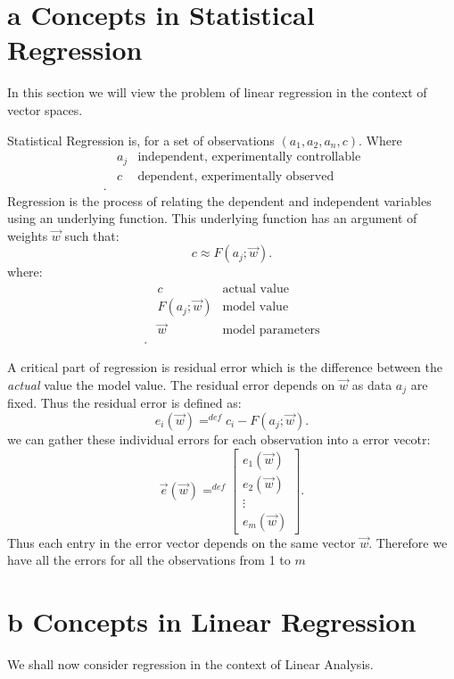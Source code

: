 \documentclass[12pt]{book}
\title{\coursetitle\linebreak\lecturename}
\author{\\Cain Susko\\ 
           \\ \\ \\
      Queen's University 
    \\School of Computing\\}
\begin{document}
\begin{titlepage}
        \maketitle
\end{titlepage}


\section*{a Concepts in Statistical Regression}
In this section we will view the problem of linear regression in the context of vector spaces.

Statistical Regression is, for a set of observations $(a_1,a_2,a_n,c)$. Where
\begin{align*}
        &a_j & \text{independent, experimentally controllable} \\
        &c & \text{dependent, experimentally observed} \\
.\end{align*}
Regression is the process of relating the dependent and independent variables using an underlying function.
This underlying function has an argument of weights $\vec w$ such that:
 \[
c \approx F(a_j;\vec w)
.\] 
where:
\begin{align*}
        &c & \text{actual value} \\
        &F\left( a_j;\vec w \right)& \text{model value} \\ 
        &\vec w & \text{model parameters} \\
.\end{align*}

A critical part of regression is residual error which is the difference between the \textit{actual} value the model value.
The residual error depends on $\vec w$ as data  $a_j$ are fixed. 
Thus the residual error is defined as:
 \[
e_i(\vec w) =^{def} c_i - F(a_j ; \vec w)
.\] 
 we can gather these individual errors for each observation into a error vecotr:
 \[
 \vec e(\vec w) =^{def} \begin{bmatrix} e_1(\vec w)\\e_2(\vec w)\\ \vdots \\ e_m\left( \vec w \right)  \end{bmatrix} 
 .\] 
 Thus each entry in the error vector depends on the same vector $\vec w$. Therefore we have all the errors for all the observations from 1 to
        $m$
\section*{b Concepts in Linear Regression}
We shall now consider regression in the context of Linear Analysis.
\end{document}
